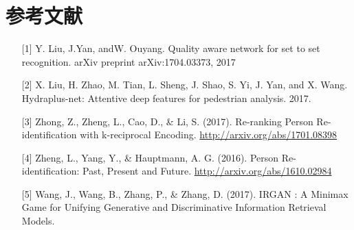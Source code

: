 {
\section{参考文献}
}

\begin{itemize}
\item [{[}1{]}] Y. Liu, J.Yan, andW. Ouyang. Quality aware network for set to set recognition. arXiv preprint arXiv:1704.03373, 2017
\item [{[}2{]}] X. Liu, H. Zhao, M. Tian, L. Sheng, J. Shao, S. Yi, J. Yan, and X. Wang. Hydraplus-net: Attentive deep features for pedestrian analysis. 2017.
\item [{[}3{]}] Zhong, Z., Zheng, L., Cao, D., \& Li, S. (2017). Re-ranking Person Re-identification with k-reciprocal Encoding. \url{http://arxiv.org/abs/1701.08398}
\item [{[}4{]}] Zheng, L., Yang, Y., \& Hauptmann, A. G. (2016). Person Re-identification: Past, Present and Future. \url{http://arxiv.org/abs/1610.02984}
\item [{[}5{]}] Wang, J., Wang, B., Zhang, P., \& Zhang, D. (2017). IRGAN : A Minimax Game for Unifying Generative and Discriminative Information Retrieval Models.
\end{itemize}


